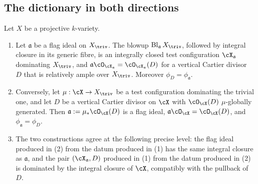 \subsection{The dictionary in both directions}
\label{sec:ch33-flag-dictionary}

\begin{theorem}
\label{thm:ch33-flag-tc-equivalence}
Let $X$ be a projective $k$-variety.
\begin{enumerate}
\item\label{itm:ch33-flag-tc:blowup}
 Let $\mathfrak a$ be a flag ideal on $X_{\triv}$.  The blowup
 $\operatorname{Bl}_{\mathfrak a}X_{\triv}$, followed by integral closure
 in its generic fibre, is an integrally closed test configuration
 $\cX_{\mathfrak a}$ dominating $X_{\triv}$, and
 $\mathfrak a\cO_{\cX_{\mathfrak a}}=\cO_{\cX_{\mathfrak a}}(D)$ for a
 vertical Cartier divisor $D$ that is relatively ample over
 $X_{\triv}$.  Moreover $\phi_D=\phi_{\mathfrak a}$.
\item\label{itm:ch33-flag-tc:pushforward}
 Conversely, let $\mu:\cX\to X_{\triv}$ be a test configuration
 dominating the trivial one, and let $D$ be a vertical Cartier divisor on
 $\cX$ with $\cO_{\cX}(D)$ $\mu$-globally generated.  Then
 $\mathfrak a:=\mu_\ast\cO_{\cX}(D)$ is a flag ideal,
 $\mathfrak a\cO_{\cX}=\cO_{\cX}(D)$, and
 $\phi_{\mathfrak a}=\phi_D$.
\item\label{itm:ch33-flag-tc:bijection}
 The two constructions agree at the following precise level: the
 flag ideal produced in (2) from the
 datum produced in (1) has the same integral
 closure as $\mathfrak a$, and the pair
 $(\cX_{\mathfrak a},D)$ produced in
 (1) from the datum produced in
 (2) is dominated by the integral closure of $\cX$,
 compatibly with the pullback of $D$.
\end{enumerate}
\end{theorem}

